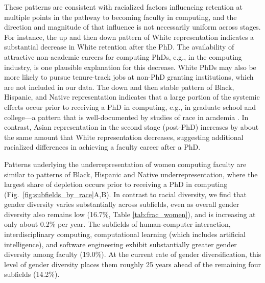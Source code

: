 \documentclass[reprint, twocolumn, aps, nofootinbib, superscriptaddress, longbibliography]{revtex4-1}
\begin{document}
These patterns are consistent with racialized factors influencing retention at multiple points in the pathway to becoming faculty in computing, and the direction and magnitude of that influence is not necessarily uniform across stages. For instance, the up and then down pattern of White representation indicates a substantial decrease in White retention after the PhD. The availability of attractive non-academic careers for computing PhDs, e.g., in the computing industry, is one plausible explanation for this decrease. White PhDs may also be more likely to pursue tenure-track jobs at non-PhD granting institutions, which are not included in our data. The down and then stable pattern of Black, Hispanic, and Native representation indicates that a large portion of the systemic effects occur prior to receiving a PhD in computing, e.g., in graduate school and college---a pattern that is well-documented by studies of race in academia \cite{ma2015race, riegle2019does}. In contrast, Asian representation in the second stage (post-PhD) increases by about the same amount that White representation decreases, suggesting additional racialized differences in achieving a faculty career after a PhD. 

Patterns underlying the underrepresentation of women computing faculty are similar to patterns of Black, Hispanic and Native underrepresentation, where the largest share of depletion occurs prior to receiving a PhD in computing (Fig.~\ref{fig:subfields_by_race}A,B). In contrast to racial diversity, we find that gender diversity varies substantially across subfields, even as overall gender diversity also remains low (16.7\%, Table \ref{tab:frac_women}), and is increasing at only about 0.2\% per year. The subfields of human-computer interaction, interdisciplinary computing, computational learning (which includes artificial intelligence), and software engineering exhibit substantially greater gender diversity among faculty (19.0\%). At the current rate of gender diversification, this level of gender diversity places them roughly 25 years ahead of the remaining four subfields (14.2\%). 
\end{document}
